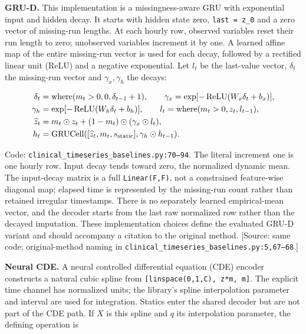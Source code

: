 \textbf{GRU-D.} This implementation is a missingness-aware GRU with exponential input and hidden decay. It starts with hidden state zero, \texttt{last =\allowbreak{} z\_\allowbreak{}0} and a zero vector of missing-run lengths. At each hourly row, observed variables reset their run length to zero; unobserved variables increment it by one. A learned affine map of the entire missing-run vector is used for each decay, followed by a rectified linear unit (ReLU) and a negative exponential. Let \(l_t\) be the last-value vector, \(\delta_t\) the missing-run vector and \(\gamma_x,\gamma_h\) the decays:

\[
\begin{aligned}
\delta_t&=\operatorname{where}(m_t>0,0,\delta_{t-1}+1),\qquad
\gamma_x=\exp[-\operatorname{ReLU}(W_x\delta_t+b_x)],\\
\gamma_h&=\exp[-\operatorname{ReLU}(W_h\delta_t+b_h)],\qquad
l_t=\operatorname{where}(m_t>0,z_t,l_{t-1}),\\
\widehat z_t&=m_t\odot z_t+(1-m_t)\odot(\gamma_x\odot l_t),\\
h_t&=\operatorname{GRUCell}([\widehat z_t,m_t,s_{\rm static}],\gamma_h\odot h_{t-1}).
\end{aligned}
\]


Code: \texttt{clinical\_\allowbreak{}timeseries\_\allowbreak{}baselines.\allowbreak{}py:\allowbreak{}70–\allowbreak{}94}. The literal increment one is one hourly row. Input decay tends toward zero, the normalized dynamic mean. The input-decay matrix is a full \texttt{Linear(F,\allowbreak{}F)}, not a constrained feature-wise diagonal map; elapsed time is represented by the missing-run count rather than retained irregular timestamps. There is no separately learned empirical-mean vector, and the decoder starts from the last raw normalized row rather than the decayed imputation. These implementation choices define the evaluated GRU-D variant and should accompany a citation to the original method. [Source: same code; original-method naming in \texttt{clinical\_\allowbreak{}timeseries\_\allowbreak{}baselines.\allowbreak{}py:\allowbreak{}5,\allowbreak{}67–\allowbreak{}68}.]

\textbf{Neural CDE.} A neural controlled differential equation (CDE) encoder constructs a natural cubic spline from \texttt{[linspace(0,\allowbreak{}1,\allowbreak{}C),\allowbreak{} z*m,\allowbreak{} m]}. The explicit time channel has normalized units; the library's spline interpolation parameter and interval are used for integration. Statics enter the shared decoder but are not part of the CDE path. If \(X\) is this spline and \(q\) its interpolation parameter, the defining operation is

